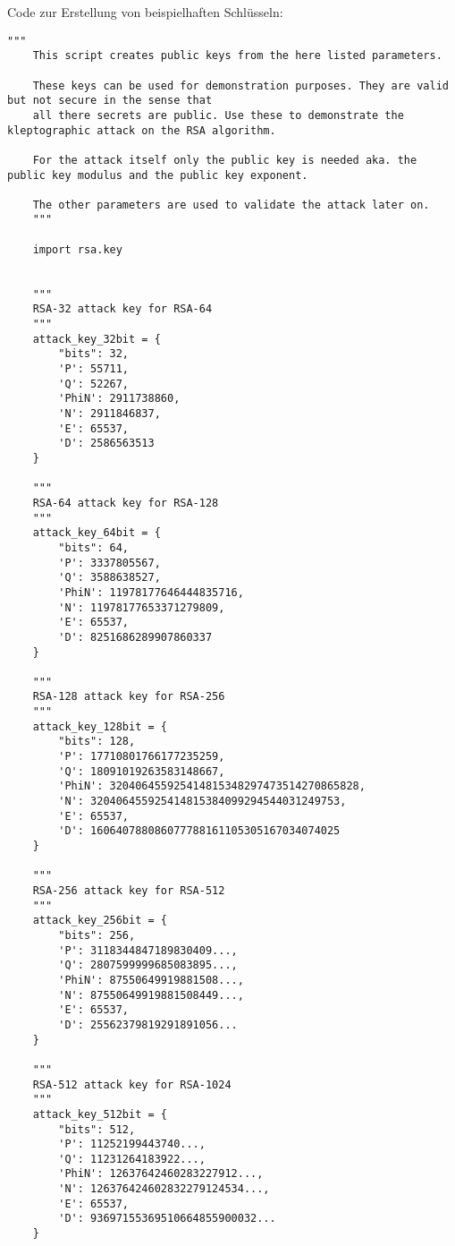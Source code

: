 \newpage
Code zur Erstellung von beispielhaften Schlüsseln:

\begin{lstlisting}[language=PyBrIM]
    """
    This script creates public keys from the here listed parameters.
    
    These keys can be used for demonstration purposes. They are valid but not secure in the sense that
    all there secrets are public. Use these to demonstrate the kleptographic attack on the RSA algorithm.
    
    For the attack itself only the public key is needed aka. the public key modulus and the public key exponent.
    
    The other parameters are used to validate the attack later on.
    """
    
    import rsa.key
    
    
    """
    RSA-32 attack key for RSA-64
    """
    attack_key_32bit = {
        "bits": 32,
        'P': 55711,
        'Q': 52267,
        'PhiN': 2911738860,
        'N': 2911846837,
        'E': 65537,
        'D': 2586563513
    }
    
    """
    RSA-64 attack key for RSA-128
    """
    attack_key_64bit = {
        "bits": 64,
        'P': 3337805567,
        'Q': 3588638527,
        'PhiN': 11978177646444835716,
        'N': 11978177653371279809,
        'E': 65537,
        'D': 8251686289907860337
    }
    
    """
    RSA-128 attack key for RSA-256
    """
    attack_key_128bit = {
        "bits": 128,
        'P': 17710801766177235259,
        'Q': 18091019263583148667,
        'PhiN': 320406455925414815348297473514270865828,
        'N': 320406455925414815384099294544031249753,
        'E': 65537,
        'D': 160640788086077788161105305167034074025
    }
    
    """
    RSA-256 attack key for RSA-512
    """
    attack_key_256bit = {
        "bits": 256,
        'P': 3118344847189830409...,
        'Q': 2807599999685083895...,
        'PhiN': 87550649919881508...,
        'N': 87550649919881508449...,
        'E': 65537,
        'D': 25562379819291891056...
    }
    
    """
    RSA-512 attack key for RSA-1024
    """
    attack_key_512bit = {
        "bits": 512,
        'P': 11252199443740...,
        'Q': 11231264183922...,
        'PhiN': 12637642460283227912...,
        'N': 126376424602832279124534...,
        'E': 65537,
        'D': 93697155369510664855900032...
    }
    

\end{lstlisting}
